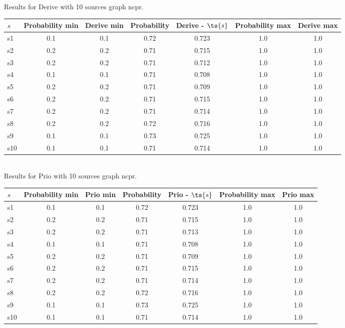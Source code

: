 \documentclass{article}
\begin{document}
\noindent Results for Derive with 10 sources graph ncpr.

\noindent\begin{tabular}{|l|c|c|c|c|c|c|}
\hline
$s$& Probability min & Derive min & Probability & Derive - $\ts{s}$ & Probability max & Derive max\\
\hline
s1 &0.1 & 0.1 & 0.72 & 0.723 & 1.0 & 1.0\\
\hline
s2 &0.2 & 0.2 & 0.71 & 0.715 & 1.0 & 1.0\\
\hline
s3 &0.2 & 0.2 & 0.71 & 0.712 & 1.0 & 1.0\\
\hline
s4 &0.1 & 0.1 & 0.71 & 0.708 & 1.0 & 1.0\\
\hline
s5 &0.2 & 0.2 & 0.71 & 0.709 & 1.0 & 1.0\\
\hline
s6 &0.2 & 0.2 & 0.71 & 0.715 & 1.0 & 1.0\\
\hline
s7 &0.2 & 0.2 & 0.71 & 0.714 & 1.0 & 1.0\\
\hline
s8 &0.2 & 0.2 & 0.72 & 0.716 & 1.0 & 1.0\\
\hline
s9 &0.1 & 0.1 & 0.73 & 0.725 & 1.0 & 1.0\\
\hline
s10 &0.1 & 0.1 & 0.71 & 0.714 & 1.0 & 1.0\\
\hline
\end{tabular}\\

\noindent Results for Prio with 10 sources graph ncpr.

\noindent\begin{tabular}{|l|c|c|c|c|c|c|}
\hline
$s$& Probability min & Prio min & Probability & Prio - $\ts{s}$ & Probability max & Prio max\\
\hline
s1 &0.1 & 0.1 & 0.72 & 0.723 & 1.0 & 1.0\\
\hline
s2 &0.2 & 0.2 & 0.71 & 0.715 & 1.0 & 1.0\\
\hline
s3 &0.2 & 0.2 & 0.71 & 0.713 & 1.0 & 1.0\\
\hline
s4 &0.1 & 0.1 & 0.71 & 0.708 & 1.0 & 1.0\\
\hline
s5 &0.2 & 0.2 & 0.71 & 0.709 & 1.0 & 1.0\\
\hline
s6 &0.2 & 0.2 & 0.71 & 0.715 & 1.0 & 1.0\\
\hline
s7 &0.2 & 0.2 & 0.71 & 0.714 & 1.0 & 1.0\\
\hline
s8 &0.2 & 0.2 & 0.72 & 0.716 & 1.0 & 1.0\\
\hline
s9 &0.1 & 0.1 & 0.73 & 0.725 & 1.0 & 1.0\\
\hline
s10 &0.1 & 0.1 & 0.71 & 0.714 & 1.0 & 1.0\\
\hline
\end{tabular}\\
\end{document}
